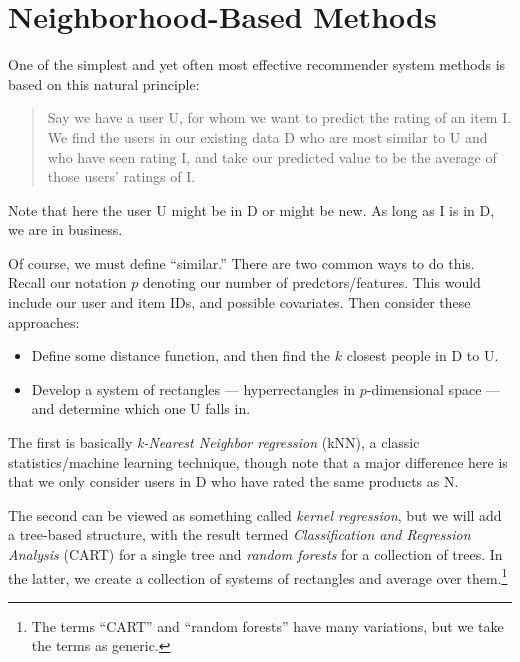 \chapter{Neighborhood-Based Methods}  
\label{chap:knn}  

One of the simplest and yet often most effective recommender system
methods is based on this natural principle: 

\begin{quote}

Say we have a user U, for whom we want to predict the rating of an item I.
We find the users in our existing data D who are most similar to U and who
have seen rating I, and take our predicted value to be the average of
those users' ratings of I. 

\end{quote}

Note that here the user U might be in D or might be new.  As long as I
is in D, we are in business.

Of course, we must define ``similar.''  There are two common ways to do
this.  Recall our notation $p$ denoting our number of
predctors/features.  This would include our user and item IDs, and
possible covariates.  Then consider these approaches:

\begin{itemize}

\item Define some distance function, and then find the $k$ closest
people in D to U.  

\item Develop a system of rectangles --- hyperrectangles in
$p$-dimensional space --- and determine which one U falls in.  

\end{itemize} 

The first is basically \textit{k-Nearest Neighbor regression} (kNN), a
classic statistics/machine learning technique, though note that a major
difference here is that we only consider users in D who have rated the
same products as N.  

The second can be viewed as something called \textit{kernel regression}, 
but we will add a tree-based structure, with the result termed
\textit{Classification and Regression Analysis} (CART) for a single
tree and \textit{random forests} for a collection of trees.  In the
latter, we create a collection of systems of rectangles and average over
them.\footnote{The terms ``CART'' and ``random forests'' have 
many variations, but we take the terms as generic.}

